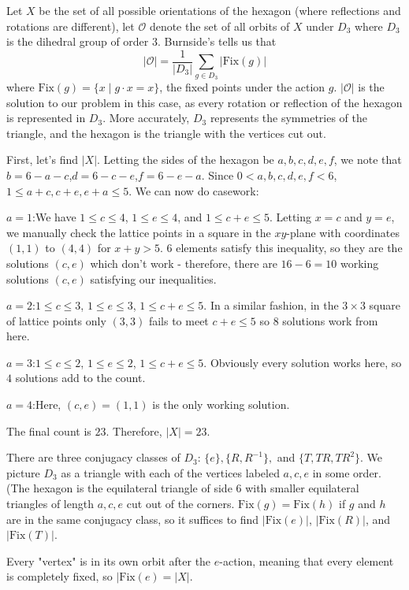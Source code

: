 \begin{enumerate}
Let $X$ be the set of all possible orientations of the hexagon (where reflections and rotations are different), let $\mathcal{O}$ denote the set of all orbits of $X$ under $D_3$ where $D_3$ is the dihedral group of order $3$. Burnside's tells us that 
 \[|\mathcal{O}| = \frac{1}{|D_3|}\sum_{g \in D_3} |\text{Fix}(g)|\] where $\text{Fix}(g) = \{x \mid g \cdot x = x\}$, the fixed points under the action $g$. $|\mathcal{O}|$ is the solution to our problem in this case, as every rotation or reflection of the hexagon is represented in $D_3$. More accurately, $D_3$ represents the symmetries of the triangle, and the hexagon is the triangle with the vertices cut out.

 First, let's find $|X|$. Letting the sides of the hexagon be $a,b,c,d,e,f$, we note that $b=6-a-c$,$d=6-c-e$,$f=6-e-a$. Since $0<a,b,c,d,e,f<6$, $1\leq a+c,c+e,e+a\leq 5$. We can now do casework:

 $a=1$:We have $1 \leq c \leq 4$, $1 \leq e \leq 4$, and $1 \leq c+e \leq 5$. Letting $x=c$ and $y=e$, we manually check the lattice points in a square in the $xy$-plane with coordinates $(1,1)$ to $(4,4)$ for $x+y > 5$. $6$ elements satisfy this inequality, so they are the solutions $(c,e)$ which don't work - therefore, there are $16-6=10$ working solutions $(c,e)$ satisfying our inequalities.

 $a=2$:$1 \leq c \leq 3$, $1 \leq e \leq 3$, $1 \leq c+e \leq 5$. In a similar fashion, in the $3 \times 3$ square of lattice points only $(3,3)$ fails to meet $c+e\leq 5$ so $8$ solutions work from here.

 $a=3$:$1 \leq c \leq 2$, $1 \leq e \leq 2$, $1 \leq c+e \leq 5$. Obviously every solution works here, so $4$ solutions add to the count.

 $a=4$:Here, $(c,e)=(1,1)$ is the only working solution.

 The final count is $23$. Therefore, $|X|=23$.

 
There are three conjugacy classes of $D_3$: $\{e\},\{R,R^{-1}\},$ and $\{T,TR,TR^2\}$. We picture $D_3$ as a triangle with each of the vertices labeled $a,c,e$ in some order. (The hexagon is the equilateral triangle of side 6 with smaller equilateral triangles of length $a,c,e$ cut out of the corners. $\text{Fix}(g)=\text{Fix}(h)$ if $g$ and $h$ are in the same conjugacy class, so it suffices to find $|\text{Fix}(e)|$, $|\text{Fix}(R)|$, and $|\text{Fix}(T)|$. 

 Every "vertex" is in its own orbit after the $e$-action, meaning that every element is completely fixed, so $|\text{Fix}(e)=|X|$. 


\end{enumerate}
